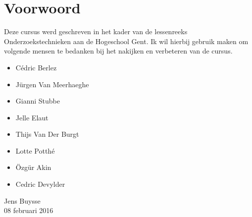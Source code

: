 

\chapter*{Voorwoord}
Deze cursus werd geschreven in het kader van de lessenreeks Onderzoekstechnieken aan de Hogeschool Gent. Ik wil hierbij gebruik maken om volgende mensen te bedanken bij het nakijken en verbeteren van de cursus.
\begin{itemize}
	\item C\'edric Berlez
	\item J\"urgen Van Meerhaeghe
	\item Gianni Stubbe
	\item Jelle Elaut
	\item Thijs Van Der Burgt
	\item Lotte Potth\'e
	\item \"Ozg\"ur Akin
	\item Cedric Devylder
\end{itemize}

\bigskip \bigskip
{\raggedleft	%
Jens Buysse\\
08 februari 2016\\
}
